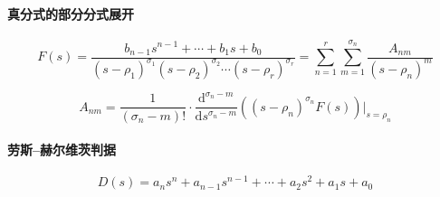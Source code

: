 \documentclass[b5paper,10pt,UTF8]{ctexart}
\begin{document}
\paragraph{真分式的部分分式展开}

\begin{displaymath}
F(s) = \frac{b_{n - 1}s^{n - 1}+\cdots+b_1s+b_0}{(s - \rho_1)^{\sigma_1}(s - \rho_2)^{\sigma_2}\cdots(s - \rho_r)^{\sigma_r}} = \sum_{n = 1}^{r}\sum_{m = 1}^{\sigma_n}\frac{A_{nm}}{(s - \rho_n)^m}
\end{displaymath}

\begin{displaymath}
A_{nm} = \frac{1}{(\sigma_n - m)!}\cdot\frac{\mathrm{d}^{\sigma_n - m}}{\mathrm{d}s^{\sigma_n - m}}((s - \rho_n)^{\sigma_n}F(s))|_{s = \rho_n}
\end{displaymath}

\paragraph{劳斯–赫尔维茨判据}

\begin{displaymath}
  D(s) = a_ns^n + a_{n - 1}s^{n - 1} + \cdots + a_2s^2 + a_1s + a_0
\end{displaymath}
\end{document}
